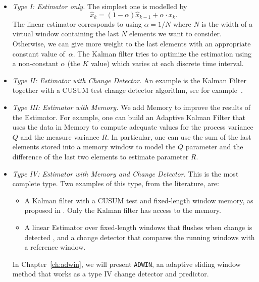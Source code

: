 \begin{itemize}
\item {\em Type I: Estimator only.} The simplest one is modelled by 
$$
\hat{x}_k= (1-\alpha)\hat{x}_{k-1}+\alpha \cdot x_k.
$$ 
The linear estimator corresponds to using  $\alpha=1/N$ where $N$ is the width of a virtual window 
containing the last $N$ elements we want to consider.
Otherwise, we can give more weight to the last elements with an appropriate constant value of~$\alpha$. 
The Kalman filter tries to optimize the estimation using a non-constant $\alpha$ (the $K$ value)
which varies at each discrete time interval. 

\item {\em Type II: Estimator with Change Detector.} 
An example is the Kalman Filter together with a CUSUM test change detector algorithm, 
see for example~\cite{jacob-04}.

\item {\em Type III: Estimator with Memory.} We add Memory to improve 
the results of the Estimator. For example, 
one can build an Adaptive Kalman Filter that uses the data in Memory to 
compute adequate values for the process variance $Q$ and the measure variance $R$. 
In particular, one can use the sum of the last elements stored into a memory window to model 
the $Q$ parameter and the difference of the last two elements to estimate parameter $R$.  

\item {\em Type IV: Estimator with Memory and Change Detector.} 
This is the most complete type. Two examples of this type, from the literature, are:
%
\begin{itemize}
\item A Kalman filter with a CUSUM test and fixed-length window memory, as proposed in \cite{SchonEG:05}. 
Only the Kalman filter has access to the memory.
\item A linear Estimator over fixed-length windows that flushes when change is detected \cite{kifer-detecting}, 
and a change detector that compares the running windows with a reference window. 
\end{itemize}
In Chapter~\ref{ch:adwin}, we will present {\tt ADWIN}, an adaptive sliding window method 
that works as a type IV change detector and predictor.
\end{itemize}
%
